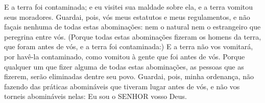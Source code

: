 {{  E a terra foi contaminada; e eu visitei sua maldade sobre ela, e a terra vomitou seus moradores.
  Guardai, pois, vós meus estatutos e meus regulamentos, e não façais nenhuma de todas estas abominações: nem o natural nem o estrangeiro que peregrina entre vós.
  (Porque todas estas abominações fizeram os homens da terra, que foram antes de vós, e a terra foi contaminada:)
  E a terra não vos vomitará, por havê-la contaminado, como vomitou à gente que foi antes de vós.
  Porque qualquer um que fizer alguma de todas estas abominações, as pessoas que as fizerem, serão eliminadas dentre seu povo.
  Guardai, pois, minha ordenança, não fazendo das práticas abomináveis que tiveram lugar antes de vós, e não vos torneis abomináveis nelas: Eu sou o SENHOR vosso Deus}.
\par }


